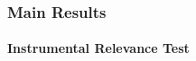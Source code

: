 \begin{frame}
    \frametitle{Main Results}
    \framesubtitle{Instrumental Relevance Test}
\end{frame}
